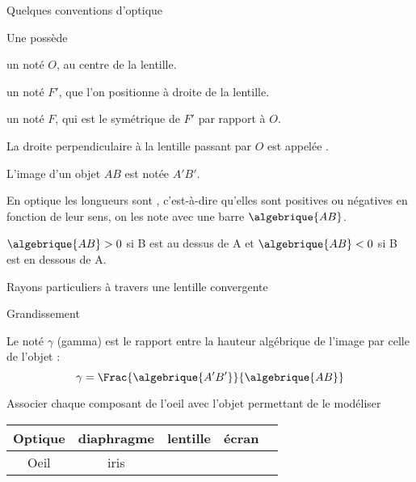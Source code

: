 \begin{doc}{Quelques conventions d'optique}
  \label{doc:convention_optique}
  \vspace{-24pt}
  \begin{encart}
    Une  possède
    \begin{listePoints}
      \item un  noté $O$, au centre de la lentille. 
      \item un  noté $F'$, que l'on positionne à droite de la lentille.
      \item un  noté $F$, qui est le symétrique de $F'$ par rapport à $O$.
    \end{listePoints}
  \end{encart}
  
  La droite perpendiculaire à la lentille passant par $O$ est appelée .
  
  L'image d'un objet $AB$ est notée $A'B'$.
  \begin{encart}
    En optique les longueurs sont , c'est-à-dire qu'elles sont positives ou négatives en fonction de leur sens, on les note avec une barre $\algebrique{AB}$.
  \end{encart}
  \exemple $\algebrique{AB} > 0$ si B est au dessus de A et $\algebrique{AB} < 0$ si B est en dessous de A.
\end{doc}

\begin{doc}{Rayons particuliers à travers une lentille convergente}
  \label{doc:rayons_lentille}
  \centering
\end{doc}

\begin{doc}{Grandissement}
  \label{doc:grandissement}
  \vspace*{-24pt}
  \begin{encart}
    Le  noté $\gamma$ (gamma) est le rapport entre la hauteur algébrique de l'image par celle de l'objet :
    \begin{equation*}
        \gamma = \Frac{\algebrique{A'B'}}{\algebrique{AB}}
    \end{equation*}
  \end{encart}
\end{doc}

\numeroQuestion
  \docu{\ref{doc:modele_oeil}}
  Associer chaque composant de l'oeil avec l'objet permettant de le modéliser
  \begin{center}
    \begin{tabular}{|c|c|c|c|c}
      \hline
      Optique & \centering diaphragme & lentille & écran 
      \\ \hline
      Oeil & \hspace{40pt} iris \hspace{40pt} & \hspace{100pt} & \hspace{100pt} 
      \\ \hline
    \end{tabular}
  \end{center}

